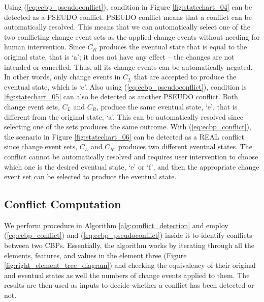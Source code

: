 Using (\ref{eq:ecbp_pseudoconflict}), condition in Figure \ref{fig:statechart_04} can be detected as a \textsf{PSEUDO} conflict. \textsf{PSEUDO} conflict means that a conflict can be automatically resolved. This means that we can automatically select one of the two conflicting change event sets as the applied change events without needing for human intervention. Since $C_{R}$ produces the eventual state that is equal to the original state, that is `a'; it does not have any effect -- the changes are not intended or cancelled. Thus, all its change events can be automatically negated. In other words, only change events in $C_{L}$ that are accepted to produce the eventual state, which is `e'. Also using (\ref{eq:ecbp_pseudoconflict}), condition is \ref{fig:statechart_05} can also be detected as another \textsf{PSEUDO} conflict. Both change event sets, $C_{L}$ and $C_{R}$, produce the same eventual state, `e', that is different from the original state, `a'. This can be automatically resolved since selecting one of the sets produces the same outcome. With (\ref{eq:ecbp_conflict}), the scenario in Figure \ref{fig:statechart_06} can be detected as a \textsf{REAL} conflict since change event sets, $C_{L}$ and $C_{R}$, produces two different eventual states. The conflict cannot be automatically resolved and requires user intervention to choose which one is the desired eventual state, `e' or `f', and then the appropriate change event set can be selected to produce the eventual state.


\subsection{Conflict Computation} 
\label{sec:conflict_computation} 
We perform procedure in Algorithm \ref{alg:conflict_detection} and employ (\ref{eq:ecbp_conflict}) and (\ref{eq:ecbp_pseudoconflict}) inside it to identify conflicts between two CBPs. Essentially, the algorithm works by iterating through all the elements, features, and values in the element three (Figure \ref{fig:right_element_tree_diagram}) and checking the equivalency of their original and eventual states as well the numbers of change events applied to them. The results are then used as inputs to decide whether a conflict has been detected or not.

